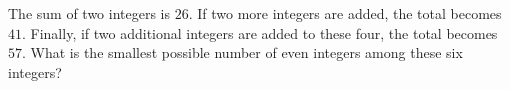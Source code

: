 The sum of two integers is $26$. If two more integers are added, the total becomes $41$. Finally, if two additional integers are added to these four, the total becomes $57$. What is the smallest possible number of even integers among these six integers?
